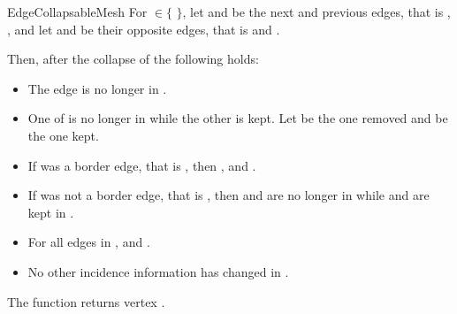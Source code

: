 \begin{ccRefConcept}{EdgeCollapsableMesh}
For  $\in \{$  $\}$, let  and  be the next and previous 
edges, that is , , and let 
 and  be their opposite edges, that is 
 and .

Then, after the collapse of  the following holds:

\begin{itemize}
\item The edge  is no longer in .
\item One of  is no longer in  while the other is kept. Let  be the one removed and  be the one kept.
\item If  was a border edge, that is , then , and .
\item If  was not a border edge, that is , then  and  are no longer in  while  and  are kept in .
\item For all edges  in ,  and .
\item No other incidence information has changed in .
\end{itemize}

The function returns vertex . 


\end{ccRefConcept}
